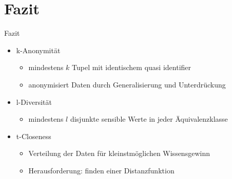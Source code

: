 \section{Fazit}
\begin{frame}{Fazit}
\begin{itemize}
	\item k-Anonymität
	\begin{itemize}
		\item mindestens $k$ Tupel mit identischem quasi identifier
		\item anonymisiert Daten durch Generalisierung und Unterdrückung 
	\end{itemize}
\end{itemize}
\vfill
\begin{itemize}
	\item l-Diversität
	\begin{itemize}
		\item mindestens $l$ disjunkte sensible Werte in jeder Äquivalenzklasse
	\end{itemize}
\end{itemize}	
\vfill
\begin{itemize}	
	\item t-Closeness
	\begin{itemize}
		\item Verteilung der Daten für kleinstmöglichen Wissensgewinn	
		\item Herausforderung: finden einer Distanzfunktion
	\end{itemize}
\end{itemize}
\end{frame}